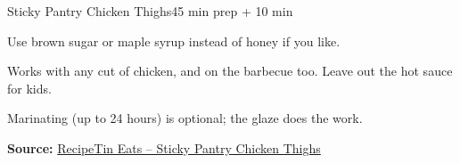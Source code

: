 \begin{recipebox}{Sticky Pantry Chicken Thighs}{4}{5 min prep + 10 min}
\begin{notelist}
  \item Use brown sugar or maple syrup instead of honey if you like.
  \item Works with any cut of chicken, and on the barbecue too. Leave out the hot
        sauce for kids.
  \item Marinating (up to 24 hours) is optional; the glaze does the work.
\end{notelist}

\noindent\textbf{Source:} \href{https://www.recipetineats.com/sticky-chicken-thighs/}{RecipeTin Eats -- Sticky Pantry Chicken Thighs}

\end{recipebox}
